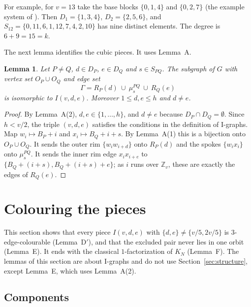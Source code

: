 \documentclass[11pt]{amsart}
\theoremstyle{plain}
\newcommand{\letteredname}{}
\newtheorem*{letteredinner}{Lemma \letteredname}
\newenvironment{lettered}[1]{\renewcommand{\letteredname}{#1}\begin{letteredinner}}{\end{letteredinner}}
\theoremstyle{definition}
\theoremstyle{remark}
\numberwithin{equation}{section}
\newcommand{\Z}{\mathbb{Z}}
\begin{document}
For example, for \(v=13\) take the base blocks \(\{0,1,4\}\) and \(\{0,2,7\}\) (the example system of \cite{DPP}). Then \(D_1=\{1,3,4\}\), \(D_2=\{2,5,6\}\), and \(S_{12}=\{0,11,6,1,12,7,4,2,10\}\) has nine distinct elements. The degree is \(6+9=15=k\).

The next lemma identifies the cubic pieces. It uses Lemma~A.

\begin{lettered}{B (the cubic pieces are I-graphs)}
Let \(P\ne Q\), \(d\in D_P\), \(e\in D_Q\) and \(s\in S_{PQ}\). The subgraph of \(G\) with vertex set \(O_P\cup O_Q\) and edge set
\begin{equation}\label{eq:piece}
\Gamma=R_P(d)\ \cup\ \mu^{PQ}_s\ \cup\ R_Q(e)
\end{equation}
is isomorphic to \(I(v,d,e)\). Moreover \(1\le d,e\le h\) and \(d\ne e\).
\end{lettered}

\begin{proof}
By Lemma~A(2), \(d,e\in\{1,\dots,h\}\), and \(d\ne e\) because \(D_P\cap D_Q=\emptyset\). Since \(h<v/2\), the triple \((v,d,e)\) satisfies the conditions in the definition of I-graphs. Map \(w_i\mapsto B_P+i\) and \(x_i\mapsto B_Q+i+s\). By Lemma~A(1) this is a bijection onto \(O_P\cup O_Q\). It sends the outer rim \(\{w_iw_{i+d}\}\) onto \(R_P(d)\) and the spokes \(\{w_ix_i\}\) onto \(\mu^{PQ}_s\). It sends the inner rim edge \(x_ix_{i+e}\) to \(\{B_Q+(i+s),B_Q+(i+s)+e\}\); as \(i\) runs over \(\Z_v\), these are exactly the edges of \(R_Q(e)\).
\end{proof}

\section{Colouring the pieces}\label{sec:pieces}

This section shows that every piece \(I(v,d,e)\) with \(\{d,e\}\ne\{v/5,2v/5\}\) is \(3\)-edge-colourable (Lemma~D\('\)), and that the excluded pair never lies in one orbit (Lemma~E). It ends with the classical \(1\)-factorization of \(K_N\) (Lemma~F). The lemmas of this section are about I-graphs and do not use Section~\ref{sec:structure}, except Lemma~E, which uses Lemma~A(2).

\subsection{Components}
\end{document}
